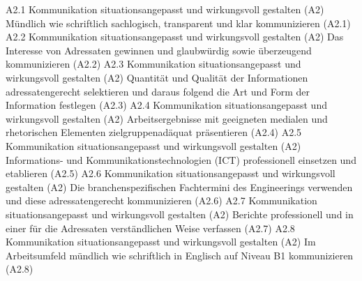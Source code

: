 \templateCard
  {A2.1}
  {Kommunikation situationsangepasst und wirkungsvoll gestalten (A2)}
  {Mündlich wie schriftlich sachlogisch, transparent und klar kommunizieren (A2.1)}
\templateCard
  {A2.2}
  {Kommunikation situationsangepasst und wirkungsvoll gestalten (A2)}
  {Das Interesse von Adressaten gewinnen und glaubwürdig sowie überzeugend kommunizieren (A2.2)}
\templateCard
  {A2.3}
  {Kommunikation situationsangepasst und wirkungsvoll gestalten (A2)}
  {Quantität und Qualität der Informationen adressatengerecht selektieren und daraus folgend die Art und Form der Information festlegen (A2.3)}
\templateCard
  {A2.4}
  {Kommunikation situationsangepasst und wirkungsvoll gestalten (A2)}
  {Arbeitsergebnisse mit geeigneten medialen und rhetorischen Elementen zielgruppenadäquat präsentieren (A2.4)}
\templateCard
  {A2.5}
  {Kommunikation situationsangepasst und wirkungsvoll gestalten (A2)}
  {Informations- und Kommunikationstechnologien (ICT) professionell einsetzen und etablieren (A2.5)}
\templateCard
  {A2.6}
  {Kommunikation situationsangepasst und wirkungsvoll gestalten (A2)}
  {Die branchenspezifischen Fachtermini des Engineerings verwenden und diese adressatengerecht kommunizieren (A2.6)}
\templateCard
  {A2.7}
  {Kommunikation situationsangepasst und wirkungsvoll gestalten (A2)}
  {Berichte professionell und in einer für die Adressaten verständlichen Weise verfassen (A2.7)}
\templateCard
  {A2.8}
  {Kommunikation situationsangepasst und wirkungsvoll gestalten (A2)}
  {Im Arbeitsumfeld mündlich wie schriftlich in Englisch auf Niveau B1 kommunizieren (A2.8)}
